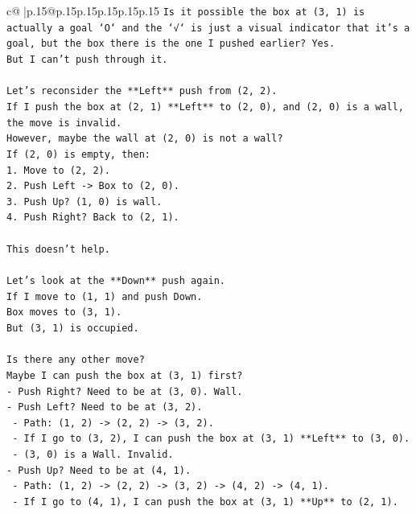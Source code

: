 \documentclass{article}
\begin{document}
{\begin{supertabular}{c@{$\;$}|p{.15\linewidth}@{}p{.15\linewidth}p{.15\linewidth}p{.15\linewidth}p{.15\linewidth}p{.15\linewidth}}
{{{\texttt{Is it possible the box at (3, 1) is actually a goal `O` and the `√` is just a visual indicator that it's a goal, but the box there is the one I pushed earlier? Yes.} \\
\texttt{But I can't push through it.} \\
\\ 
\texttt{Let's reconsider the **Left** push from (2, 2).} \\
\texttt{If I push the box at (2, 1) **Left** to (2, 0), and (2, 0) is a wall, the move is invalid.} \\
\texttt{However, maybe the wall at (2, 0) is not a wall?} \\
\texttt{If (2, 0) is empty, then:} \\
\texttt{1. Move to (2, 2).} \\
\texttt{2. Push Left {-}> Box to (2, 0).} \\
\texttt{3. Push Up? (1, 0) is wall.} \\
\texttt{4. Push Right? Back to (2, 1).} \\
\\ 
\texttt{This doesn't help.} \\
\\ 
\texttt{Let's look at the **Down** push again.} \\
\texttt{If I move to (1, 1) and push Down.} \\
\texttt{Box moves to (3, 1).} \\
\texttt{But (3, 1) is occupied.} \\
\\ 
\texttt{Is there any other move?} \\
\texttt{Maybe I can push the box at (3, 1) first?} \\
\texttt{{-} Push Right? Need to be at (3, 0). Wall.} \\
\texttt{{-} Push Left? Need to be at (3, 2).} \\
\texttt{  {-} Path: (1, 2) {-}> (2, 2) {-}> (3, 2).} \\
\texttt{  {-} If I go to (3, 2), I can push the box at (3, 1) **Left** to (3, 0).} \\
\texttt{  {-} (3, 0) is a Wall. Invalid.} \\
\texttt{{-} Push Up? Need to be at (4, 1).} \\
\texttt{  {-} Path: (1, 2) {-}> (2, 2) {-}> (3, 2) {-}> (4, 2) {-}> (4, 1).} \\
\texttt{  {-} If I go to (4, 1), I can push the box at (3, 1) **Up** to (2, 1).} \\
}}}
\end{supertabular}}
\end{document}
